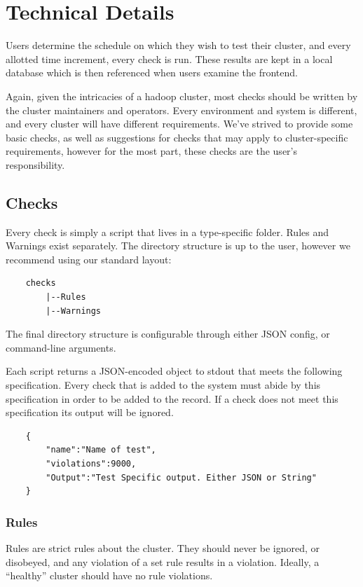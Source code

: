 \section{Technical Details}
Users determine the schedule on which they wish to test their cluster, and every allotted time increment, every check
is run. These results are kept in a local database which is then referenced when users examine the frontend.

Again, given the intricacies of a hadoop cluster, most checks should be written by the cluster maintainers and
operators. Every environment and system is different, and every cluster will have different requirements. We've strived
to provide some basic checks, as well as suggestions for checks that may apply to cluster-specific requirements, however
for the most part, these checks are the user's responsibility.

    \subsection{Checks}
    Every check is simply a script that lives in a type-specific folder. Rules and Warnings exist separately. The directory
    structure is up to the user, however we recommend using our standard layout:

    \begin{verbatim}
    checks
        |--Rules
        |--Warnings
    \end{verbatim}

    The final directory structure is configurable through either JSON config, or command-line arguments.

    Each script returns a JSON-encoded object to {\ttfamily stdout} that meets the following specification. Every check
    that is added to the system must abide by this specification in order to be added to the record. If a check does
    not meet this specification its output will be ignored.

    \begin{verbatim}
    {
        "name":"Name of test",
        "violations":9000,
        "Output":"Test Specific output. Either JSON or String"
    }
    \end{verbatim}

        \subsubsection{Rules}
        Rules are strict rules about the cluster. They should never be ignored, or disobeyed, and any violation of a set rule
        results in a violation. Ideally, a ``healthy'' cluster should have no rule violations.

